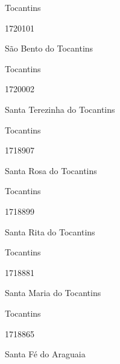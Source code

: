 \documentclass[
  letterpaper,
]{report}
\begin{document}
\n    

\n    

\n      

Tocantins

\n      

1720101

\n      

São Bento do Tocantins

\n    

\n    

\n      

Tocantins

\n      

1720002

\n      

Santa Terezinha do Tocantins

\n    

\n    

\n      

Tocantins

\n      

1718907

\n      

Santa Rosa do Tocantins

\n    

\n    

\n      

Tocantins

\n      

1718899

\n      

Santa Rita do Tocantins

\n    

\n    

\n      

Tocantins

\n      

1718881

\n      

Santa Maria do Tocantins

\n    

\n    

\n      

Tocantins

\n      

1718865

\n      

Santa Fé do Araguaia

\n    

\n    

\n      
\end{document}
